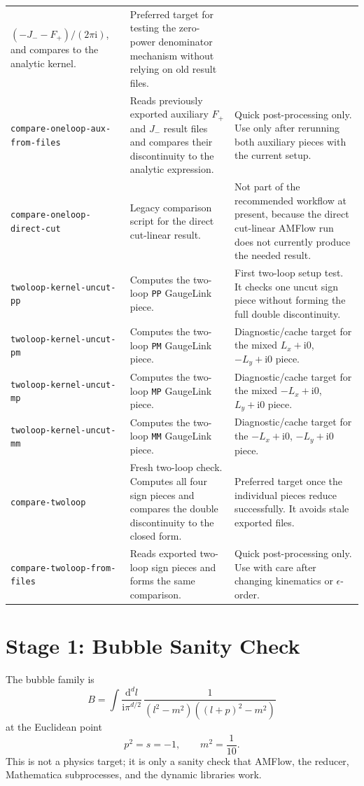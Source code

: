 \documentclass[11pt]{article}
\newcommand{\dd}{\mathrm{d}}
\newcommand{\ii}{\mathrm{i}}
\newcommand{\eps}{\epsilon}
\newcommand{\WL}[1]{\texttt{#1}}
\begin{document}
\begin{center}
\begin{tabular}{p{}p{}p{}}
  \((-J_--F_+)/(2\pi\ii)\), and compares to the analytic kernel.
& Preferred target for testing the zero-power denominator mechanism without
  relying on old result files. \\
\WL{compare-oneloop-aux-from-files}
& Reads previously exported auxiliary \(F_+\) and \(J_-\) result files and
  compares their discontinuity to the analytic expression.
& Quick post-processing only. Use only after rerunning both auxiliary pieces
  with the current setup. \\
\WL{compare-oneloop-direct-cut}
& Legacy comparison script for the direct cut-linear result.
& Not part of the recommended workflow at present, because the direct
  cut-linear AMFlow run does not currently produce the needed result. \\
\WL{twoloop-kernel-uncut-pp}
& Computes the two-loop \WL{PP} GaugeLink piece.
& First two-loop setup test. It checks one uncut sign piece without forming
  the full double discontinuity. \\
\WL{twoloop-kernel-uncut-pm}
& Computes the two-loop \WL{PM} GaugeLink piece.
& Diagnostic/cache target for the mixed \(L_x+\ii0\), \(-L_y+\ii0\) piece. \\
\WL{twoloop-kernel-uncut-mp}
& Computes the two-loop \WL{MP} GaugeLink piece.
& Diagnostic/cache target for the mixed \(-L_x+\ii0\), \(L_y+\ii0\) piece. \\
\WL{twoloop-kernel-uncut-mm}
& Computes the two-loop \WL{MM} GaugeLink piece.
& Diagnostic/cache target for the \(-L_x+\ii0\), \(-L_y+\ii0\) piece. \\
\WL{compare-twoloop}
& Fresh two-loop check. Computes all four sign pieces and compares the double
  discontinuity to the closed form.
& Preferred target once the individual pieces reduce successfully. It avoids
  stale exported files. \\
\WL{compare-twoloop-from-files}
& Reads exported two-loop sign pieces and forms the same comparison.
& Quick post-processing only. Use with care after changing kinematics or
  \(\eps\)-order. \\
\hline
\end{tabular}
\end{center}

\section{Stage 1: Bubble Sanity Check}

The bubble family is
\begin{equation}
  B =
  \int \frac{\dd^d l}{\ii\pi^{d/2}}\,
  \frac{1}{(l^2-m^2)((l+p)^2-m^2)}
\end{equation}
at the Euclidean point
\begin{equation}
  p^2=s=-1,\qquad m^2=\frac{1}{10}.
\end{equation}
This is not a physics target; it is only a sanity check that AMFlow, the
reducer, Mathematica subprocesses, and the dynamic libraries work.
\end{document}

